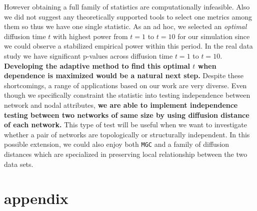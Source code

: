\documentclass[12pt]{article}
\theoremstyle{definition}
\begin{document}
However obtaining a full family of statistics are computationally infeasible. Also we did not suggest any theoretically supported tools to select one metrics among them so thus we have one single statistic. As an ad hoc, we selected an \textit{optimal} diffusion time $t$ with highest power from $t=1$ to $t=10$ for our simulation since we could observe a stabilized empirical power within this period. In the real data study we have significant p-values across diffusion time $t=1$ to $t=10$. 
\textbf{Developing the adaptive method to find this optimal $t$ when dependence is maximized would be a natural next step.} Despite these shortcomings, a range of applications based on our work are very diverse. Even though we specifically constraint the statistic into testing independence between network and nodal attributes, \textbf{we are able to implement independence testing between two networks of same size by using diffusion distance of each network.} This type of test will be useful when we want to investigate whether a pair of networks are topologically or structurally independent. In this possible extension, we could also enjoy both \texttt{MGC} and a family of diffusion distances which are specialized in preserving local relationship between the two data sets. 

\appendix
\section{appendix}
\label{sec:appendix}
\end{document}
